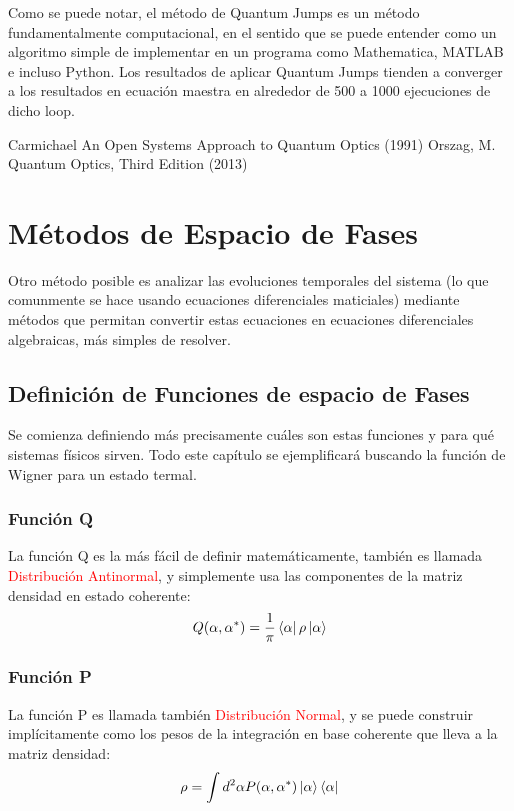 \documentclass{book}
\begin{document}
Como se puede notar, el método de Quantum Jumps es un método fundamentalmente computacional, en el sentido que se puede entender como un algoritmo simple de implementar en un programa como Mathematica, MATLAB e incluso Python. Los resultados de aplicar Quantum Jumps tienden a converger a los resultados en ecuación maestra en alrededor de 500 a 1000 ejecuciones de dicho loop.
\begin{thebibliography}{XXX0000}
 Carmichael An Open Systems Approach to Quantum Optics (1991)
 Orszag, M. Quantum Optics, Third Edition (2013)
\end{thebibliography}
\chapter{Métodos de Espacio de Fases}
Otro método posible es analizar las evoluciones temporales del sistema (lo que comunmente se hace usando ecuaciones diferenciales maticiales) mediante métodos que permitan convertir estas ecuaciones en ecuaciones diferenciales algebraicas, más simples de resolver.
\section{Definición de Funciones de espacio de Fases}
Se comienza definiendo más precisamente cuáles son estas funciones y para qué sistemas físicos sirven. Todo este capítulo se ejemplificará buscando la función de Wigner para un estado termal.
\subsection{Función Q}
La función Q es la más fácil de definir matemáticamente, también es llamada \textcolor{red}{Distribución Antinormal}, y simplemente usa las componentes de la matriz densidad en estado coherente:
\begin{equation}\label{eq6.1}Q(\alpha, \alpha^*)=\frac{1}{\pi}\bra{\alpha}\rho\ket{\alpha}\end{equation}
\subsection{Función P}
La función P es llamada también \textcolor{red}{Distribución Normal}, y se puede construir implícitamente como los pesos de la integración en base coherente que lleva a la matriz densidad:
\begin{equation}\label{eq6.2}\rho=\int d^2 \alpha P
(\alpha,\alpha^*)\ket{\alpha}\bra{\alpha}\end{equation}
\end{document}
